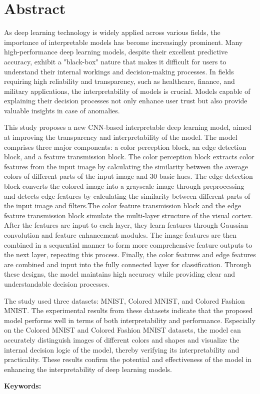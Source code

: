 \documentclass[class=NCU_thesis, crop=false]{standalone}
\begin{document}
\chapter{Abstract}

As deep learning technology is widely applied across various fields, the importance of interpretable models has become increasingly prominent. Many high-performance deep learning models, despite their excellent predictive accuracy, exhibit a "black-box" nature that makes it difficult for users to understand their internal workings and decision-making processes. In fields requiring high reliability and transparency, such as healthcare, finance, and military applications, the interpretability of models is crucial. Models capable of explaining their decision processes not only enhance user trust but also provide valuable insights in case of anomalies.

This study proposes a new CNN-based interpretable deep learning model, aimed at improving the transparency and interpretability of the model. The model comprises three major components: a color perception block, an edge detection block, and a feature transmission block. The color perception block extracts color features from the input image by calculating the similarity between the average colors of different parts of the input image and 30 basic hues. The edge detection block converts the colored image into a grayscale image through preprocessing and detects edge features by calculating the similarity between different parts of the input image and filters.The color feature transmission block and the edge feature transmission block simulate the multi-layer structure of the visual cortex. After the features are input to each layer, they learn features through Gaussian convolution and feature enhancement modules. The image features are then combined in a sequential manner to form more comprehensive feature outputs to the next layer, repeating this process. Finally, the color features and edge features are combined and input into the fully connected layer for classification. Through these designs, the model maintains high accuracy while providing clear and understandable decision processes.

The study used three datasets: MNIST, Colored MNIST, and Colored Fashion MNIST. The experimental results from these datasets indicate that the proposed model performs well in terms of both interpretability and performance. Especially on the Colored MNIST and Colored Fashion MNIST datasets, the model can accurately distinguish images of different colors and shapes and visualize the internal decision logic of the model, thereby verifying its interpretability and practicality. These results confirm the potential and effectiveness of the model in enhancing the interpretability of deep learning models.

\vspace{2em}
\noindent \textbf{Keywords:} \keywordsEn{} %
\end{document}
